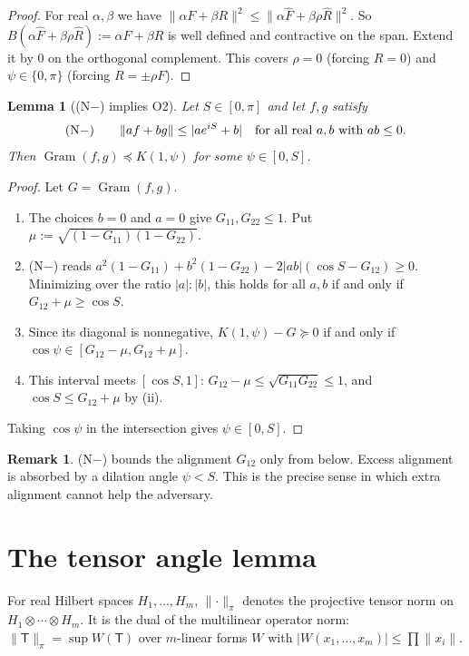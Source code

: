 \documentclass[11pt]{amsart}
\newtheorem{lemma}[theorem]{Lemma}
\theoremstyle{definition}
\newtheorem*{remark}{Remark}
\newcommand{\Gram}{\operatorname{Gram}}
\newcommand{\norm}[1]{\lVert #1\rVert}
\newcommand{\abs}[1]{\lvert #1\rvert}
\begin{document}
\begin{proof}
For real $\alpha,\beta$ we have
$\norm{\alpha F+\beta R}^2\le\norm{\alpha\hat F+\beta\rho\hat R}^2$. So
$B(\alpha\hat F+\beta\rho\hat R):=\alpha F+\beta R$ is well defined and contractive
on the span. Extend it by $0$ on the orthogonal complement. This covers $\rho=0$
(forcing $R=0$) and $\psi\in\{0,\pi\}$ (forcing $R=\pm\rho F$).
\end{proof}

\begin{lemma}[(N$-$) implies O2]\label{lem:N-}
Let $S\in[0,\pi]$ and let $f,g$ satisfy
\[
\textup{(N$-$)}\qquad \norm{af+bg}\le\abs{ae^{iS}+b}\quad\text{for all real }a,b\text{ with }ab\le0.
\]
Then $\Gram(f,g)\preceq K(1,\psi)$ for some $\psi\in[0,S]$.
\end{lemma}

\begin{proof}
Let $G=\Gram(f,g)$.
\begin{enumerate}[label=\textup{(\roman*)}]
\item The choices $b=0$ and $a=0$ give $G_{11},G_{22}\le1$. Put $\mu:=\sqrt{(1-G_{11})(1-G_{22})}$.
\item (N$-$) reads $a^2(1-G_{11})+b^2(1-G_{22})-2\abs{ab}(\cos S-G_{12})\ge0$.
  Minimizing over the ratio $\abs a:\abs b$, this holds for all $a,b$ if and only if
  $G_{12}+\mu\ge\cos S$.
\item Since its diagonal is nonnegative, $K(1,\psi)-G\succeq0$ if and only if
  $\cos\psi\in[G_{12}-\mu,G_{12}+\mu]$.
\item This interval meets $[\cos S,1]$: $G_{12}-\mu\le\sqrt{G_{11}G_{22}}\le1$, and
  $\cos S\le G_{12}+\mu$ by (ii).
\end{enumerate}
Taking $\cos\psi$ in the intersection gives $\psi\in[0,S]$.
\end{proof}

\begin{remark}
(N$-$) bounds the alignment $G_{12}$ only from below. Excess alignment is absorbed by
a dilation angle $\psi<S$. This is the precise sense in which extra alignment
cannot help the adversary.
\end{remark}

\section{The tensor angle lemma}\label{sec:tensor}

For real Hilbert spaces $H_1,\dots,H_m$, $\norm{\cdot}_\pi$ denotes the projective
tensor norm on $H_1\otimes\cdots\otimes H_m$. It is the dual of the multilinear
operator norm: $\norm{\mathsf T}_\pi=\sup W(\mathsf T)$ over $m$-linear forms $W$ with
$\abs{W(x_1,\dots,x_m)}\le\prod\norm{x_i}$.
\end{document}
